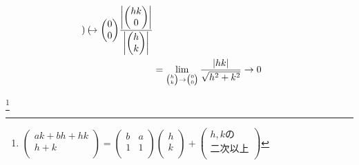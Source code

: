 \begin{example}
\[\begin{split}
{\begin{pmatrix}
\end{pmatrix}
\to
\begin{pmatrix}
0 \\
0 \\
\end{pmatrix}}
\frac{\left|
\begin{pmatrix}
hk \\
0 \\
\end{pmatrix}
\right|}{\left|
\begin{pmatrix}
h \\
k \\
\end{pmatrix}
\right|}
\\
&=
\lim_{
\tiny
\begin{pmatrix}
h \\
k \\
\end{pmatrix}
\to
\begin{pmatrix}
0 \\
0 \\
\end{pmatrix}}
\frac{|hk|}{\sqrt{h^2+k^2}}\to0
\end{split}
\]
\end{example}
\footnote{
$
\begin{pmatrix}
ak+bh+hk \\
h+k \\
\end{pmatrix}
=
\begin{pmatrix}
b & a \\
1 & 1\\
\end{pmatrix}
\begin{pmatrix}
h \\
k \\
\end{pmatrix}
+
\begin{pmatrix}
h,kの\\
二次以上 \\
\end{pmatrix}
$
}
